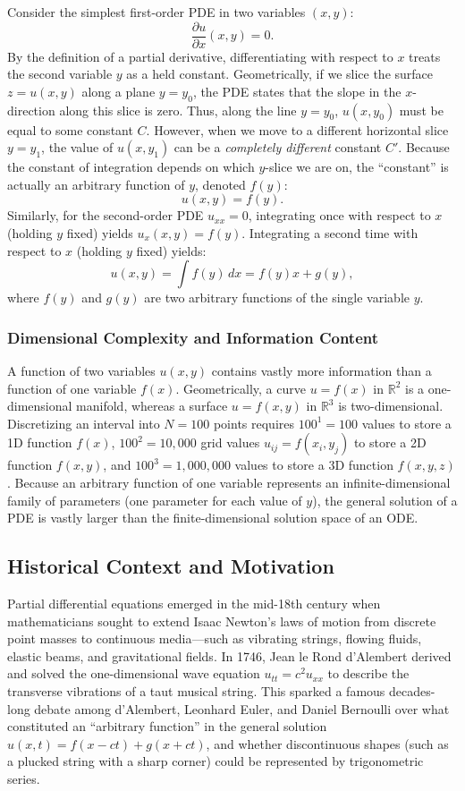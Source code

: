 \documentclass[11pt,a4paper]{article}
\begin{document}
Consider the simplest first-order PDE in two variables $(x, y)$:
\[
    \frac{\partial u}{\partial x}(x, y) = 0.
\]
By the definition of a partial derivative, differentiating with respect to $x$ treats the second variable $y$ as a held constant. Geometrically, if we slice the surface $z = u(x, y)$ along a plane $y = y_0$, the PDE states that the slope in the $x$-direction along this slice is zero. Thus, along the line $y = y_0$, $u(x, y_0)$ must be equal to some constant $C$. However, when we move to a different horizontal slice $y = y_1$, the value of $u(x, y_1)$ can be a \emph{completely different} constant $C'$. Because the constant of integration depends on which $y$-slice we are on, the ``constant'' is actually an arbitrary function of $y$, denoted $f(y)$:
\[
    u(x, y) = f(y).
\]
Similarly, for the second-order PDE $u_{xx} = 0$, integrating once with respect to $x$ (holding $y$ fixed) yields $u_x(x, y) = f(y)$. Integrating a second time with respect to $x$ (holding $y$ fixed) yields:
\[
    u(x, y) = \int f(y)\,dx = f(y)x + g(y),
\]
where $f(y)$ and $g(y)$ are two arbitrary functions of the single variable $y$.

\subsubsection{Dimensional Complexity and Information Content}
A function of two variables $u(x, y)$ contains vastly more information than a function of one variable $f(x)$. Geometrically, a curve $u = f(x)$ in $\mathbb{R}^2$ is a one-dimensional manifold, whereas a surface $u = f(x, y)$ in $\mathbb{R}^3$ is two-dimensional. Discretizing an interval into $N = 100$ points requires $100^1 = 100$ values to store a 1D function $f(x)$, $100^2 = 10{,}000$ grid values $u_{ij} = f(x_i, y_j)$ to store a 2D function $f(x, y)$, and $100^3 = 1{,}000{,}000$ values to store a 3D function $f(x, y, z)$. Because an arbitrary function of one variable represents an infinite-dimensional family of parameters (one parameter for each value of $y$), the general solution of a PDE is vastly larger than the finite-dimensional solution space of an ODE.

\subsection{Historical Context and Motivation}
Partial differential equations emerged in the mid-18th century when mathematicians sought to extend Isaac Newton's laws of motion from discrete point masses to continuous media—such as vibrating strings, flowing fluids, elastic beams, and gravitational fields. In 1746, Jean le Rond d'Alembert derived and solved the one-dimensional wave equation $u_{tt} = c^2 u_{xx}$ to describe the transverse vibrations of a taut musical string. This sparked a famous decades-long debate among d'Alembert, Leonhard Euler, and Daniel Bernoulli over what constituted an ``arbitrary function'' in the general solution $u(x, t) = f(x - ct) + g(x + ct)$, and whether discontinuous shapes (such as a plucked string with a sharp corner) could be represented by trigonometric series.
\end{document}
